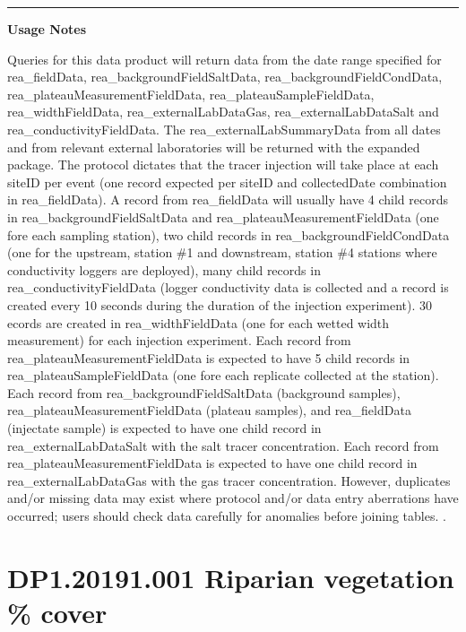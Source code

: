 \documentclass[]{article}
\begin{document}
\begin{center}\rule{0.5\linewidth}{\linethickness}\end{center}

\textbf{Usage Notes}

Queries for this data product will return data from the date range
specified for rea\_fieldData, rea\_backgroundFieldSaltData,
rea\_backgroundFieldCondData, rea\_plateauMeasurementFieldData,
rea\_plateauSampleFieldData, rea\_widthFieldData,
rea\_externalLabDataGas, rea\_externalLabDataSalt and
rea\_conductivityFieldData. The rea\_externalLabSummaryData from all
dates and from relevant external laboratories will be returned with the
expanded package. The protocol dictates that the tracer injection will
take place at each siteID per event (one record expected per siteID and
collectedDate combination in rea\_fieldData). A record from
rea\_fieldData will usually have 4 child records in
rea\_backgroundFieldSaltData and rea\_plateauMeasurementFieldData (one
fore each sampling station), two child records in
rea\_backgroundFieldCondData (one for the upstream, station \#1 and
downstream, station \#4 stations where conductivity loggers are
deployed), many child records in rea\_conductivityFieldData (logger
conductivity data is collected and a record is created every 10 seconds
during the duration of the injection experiment). 30 ecords are created
in rea\_widthFieldData (one for each wetted width measurement) for each
injection experiment. Each record from rea\_plateauMeasurementFieldData
is expected to have 5 child records in rea\_plateauSampleFieldData (one
fore each replicate collected at the station). Each record from
rea\_backgroundFieldSaltData (background samples),
rea\_plateauMeasurementFieldData (plateau samples), and rea\_fieldData
(injectate sample) is expected to have one child record in
rea\_externalLabDataSalt with the salt tracer concentration. Each record
from rea\_plateauMeasurementFieldData is expected to have one child
record in rea\_externalLabDataGas with the gas tracer concentration.
However, duplicates and/or missing data may exist where protocol and/or
data entry aberrations have occurred; users should check data carefully
for anomalies before joining tables. \newpage
.

\section{DP1.20191.001 Riparian vegetation \%
cover}\label{dp1.20191.001-riparian-vegetation-cover}
\end{document}
